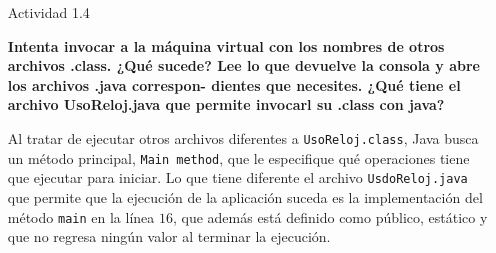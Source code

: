 \documentclass[11pt,letterpaper]{article}
\begin{document}
\begin{enumerate}
    \item [Actividad 1.4] {\bfseries Intenta invocar a la máquina virtual con los
    nombres de otros archivos .class. ¿Qué sucede? Lee lo que devuelve la consola
    y abre los archivos .java correspon- dientes que necesites. ¿Qué tiene el archivo
    UsoReloj.java que permite invocarl su .class con java? \par}

        Al tratar de ejecutar otros archivos diferentes a \verb|UsoReloj.class|, Java
        busca un método principal, \verb|Main method|, que le especifique qué operaciones
        tiene que ejecutar para iniciar. Lo que tiene diferente el archivo
        \verb|UsdoReloj.java| que permite que la ejecución de la aplicación suceda es la
        implementación del método \verb|main| en la línea $16$, que además está definido
        como público, estático y que no regresa ningún valor al terminar la ejecución.

\end{enumerate}
\end{document}
